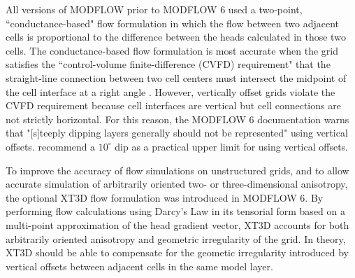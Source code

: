 \documentclass{article}
\begin{document}
All versions of MODFLOW prior to MODFLOW 6 used a two-point, ``conductance-based" flow formulation in which the flow between two adjacent cells is proportional to the difference between the heads calculated in those two cells. The conductance-based flow formulation is most accurate when the grid satisfies the ``control-volume finite-difference (CVFD) requirement" that the straight-line connection between two cell centers must intersect the midpoint of the cell interface at a right angle \citep{narasimhan1976integrated}. However, vertically offset grids violate the CVFD requirement because cell interfaces are vertical but cell connections are not strictly horizontal. For this reason, the MODFLOW 6 documentation \citep{modflow6gwf} warns that "[s]teeply dipping layers generally should not be represented" using vertical offsets. \cite{anderson2015applied} recommend a $10^{\circ}$ dip as a practical upper limit for using vertical offsets.

To improve the accuracy of flow simulations on unstructured grids, and to allow accurate simulation of arbitrarily oriented two- or three-dimensional anisotropy, the optional XT3D flow formulation \citep{modflow6xt3d} was introduced in MODFLOW 6. By performing flow calculations using Darcy's Law in its tensorial form based on a multi-point approximation of the head gradient vector, XT3D accounts for both arbitrarily oriented anisotropy and geometric irregularity of the grid. In theory, XT3D should be able to compensate for the geometic irregularity introduced by vertical offsets between adjacent cells in the same model layer.
\end{document}
